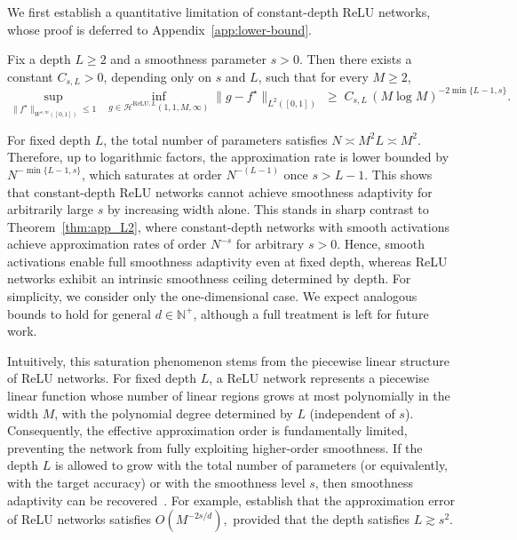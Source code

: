 \documentclass[11pt]{article}
\begin{document}
We first establish a quantitative limitation of constant-depth ReLU networks,  whose proof is deferred to Appendix~\ref{app:lower-bound}.

\begin{proposition}
\label{prop:relu_lower_bound}
    Fix a depth $L\ge 2$ and a smoothness parameter $s>0$. Then there exists a constant
    $C_{s,L}>0$, depending only on $s$ and $L$, such that for every $M\ge 2$,
    \[
    \sup_{\|f^\star\|_{W^{s,\infty}([0,1])}\le 1}\;\,
    \inf_{g\in \mathcal{H}^{\mathrm{ReLU},L}(1,1,M,\infty)}
    \|g-f^\star\|_{L^2([0,1])}
    \;\ge\;
    C_{s,L}\,(M\log M)^{-2\min\{L-1,s\}} .
    \]
\end{proposition}


For fixed depth $L$, the total number of parameters satisfies 
$
N \asymp M^2 L \asymp M^2.
$
Therefore, up to logarithmic factors, the approximation rate is lower bounded by 
$N^{-\min\{L-1,s\}}$, which saturates at order $N^{-(L-1)}$ once $s > L-1$. 
This shows that constant-depth ReLU networks cannot achieve smoothness adaptivity for arbitrarily large $s$ by increasing width alone. This stands in sharp contrast to Theorem~\ref{thm:app_L2}, where constant-depth networks with smooth activations achieve approximation rates of order $N^{-s}$  for arbitrary $s>0$. Hence, smooth activations enable full smoothness adaptivity even at fixed depth, whereas ReLU networks exhibit an intrinsic smoothness ceiling determined by depth. For simplicity, we consider only the one-dimensional case. We expect analogous bounds to hold for general $d \in \mathbb{N}^+$, although a full treatment is left for future work.




Intuitively, this saturation phenomenon stems from the piecewise linear structure of ReLU networks. 
For fixed depth $L$, a ReLU network represents a piecewise linear function whose number of linear regions grows at most polynomially in the width $M$, with the polynomial degree determined by $L$ (independent of $s$). 
Consequently, the effective approximation order is fundamentally limited, preventing the network from fully exploiting higher-order smoothness.
If the depth $L$ is allowed to grow with the total number of parameters (or equivalently, with the target accuracy) or with the smoothness level $s$, then smoothness adaptivity can be recovered~\citep{yarotsky2017error,liang2017deep,lu2021deep}. 
For example, \citet{lu2021deep} establish that the approximation error of ReLU networks satisfies
$
O(M^{-2s/d}),
$
provided that the depth satisfies $L \gtrsim s^2$.
\end{document}
